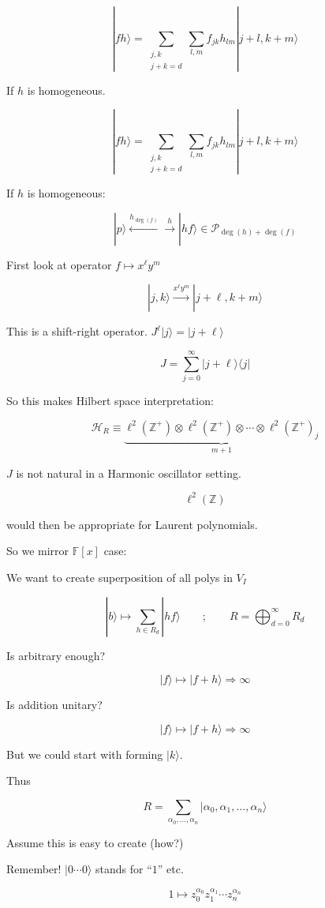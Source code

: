 \[
|fh\rangle=\sum_{\substack{j,k\\j+k=d}}\sum_{l,m}f_{jk}h_{lm}|j+l,k+m\rangle
\]

If $h$ is homogeneous.

\[
|fh\rangle=\sum_{\substack{j,k\\j+k=d}}\sum_{l,m}f_{jk}h_{lm}|j+l,k+m\rangle
\]

If $h$ is homogeneous:

\[
|p\rangle \xleftarrow{h_{\deg(f)}} \xrightarrow{h} |hf\rangle\in\mathcal{P}_{\deg(h)+\deg(f)}
\]

First look at operator \quad $f\mapsto x^\ell y^m$

\[
|j,k\rangle\xrightarrow{x^\ell y^m}|j+\ell,k+m\rangle
\]

This is a shift-right operator. \quad $J^\ell|j\rangle=|j+\ell\rangle$

\[
J=\sum_{j=0}^{\infty}|j+\ell\rangle\langle j|
\]

So this makes Hilbert space interpretation:

\[
\mathcal{H}_R\equiv
\underbrace{\ell^2(\mathbb{Z}^+)\otimes\ell^2(\mathbb{Z}^+)\otimes\cdots\otimes\ell^2(\mathbb{Z}^+)_j}_{m+1}
\]

$J$ is not natural in a Harmonic oscillator setting.

\[
\ell^2(\mathbb{Z})
\]

would then be appropriate for Laurent polynomials.

So we mirror $\mathbb{F}[x]$ case:

We want to create superposition of all polys in $V_I$

\[
|b\rangle\longmapsto\sum_{h\in R_d}|hf\rangle
\qquad;\qquad
R=\bigoplus_{d=0}^{\infty}R_d
\]

Is arbitrary enough?

\[
|f\rangle\longmapsto|f+h\rangle\Rightarrow\infty
\]

Is addition unitary?

\[
|f\rangle\longmapsto |f+h\rangle\Rightarrow\infty
\]

But we could start with forming $|k\rangle$.

Thus

\[
R=\sum_{\alpha_0,\ldots,\alpha_n}
|\alpha_0,\alpha_1,\ldots,\alpha_n\rangle
\]

Assume this is easy to create (how?)

Remember! $|0\cdots 0\rangle$ stands for ``$1$'' etc.

\[
1\longmapsto z_0^{\alpha_0}z_1^{\alpha_1}\cdots z_n^{\alpha_n}
\]

